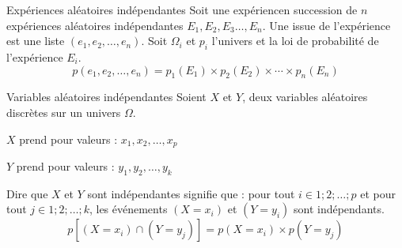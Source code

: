 \medskip

\begin{bclogo}{Expériences aléatoires indépendantes}
Soit une expériencen succession de $n$ expériences aléatoires indépendantes $E_1,E_2,E_3\ldots,E_n$. Une issue de l'expérience est une liste $(e_1,e_2,\ldots,e_n)$. Soit $\Omega_i$ et $p_i$ l'univers et la loi de probabilité de l'expérience $E_i$.
\[p(e_1,e_2,\ldots,e_n)=p_1(E_1)\times p_2(E_2)\times \cdots \times p_n(E_n)\]
\end{bclogo}

\medskip

\begin{bclogo}{Variables aléatoires indépendantes}
Soient $X$ et $Y$, deux variables aléatoires discrètes sur un univers $\Omega$. 

$X$ prend pour valeurs : $x_1,x_2,\ldots,x_p$

$Y$ prend pour valeurs : $y_1,y_2,\ldots,y_k$

Dire que $X$ et $Y$ sont indépendantes signifie que : pour tout $i\in {1;2;\ldots;p}$ et pour tout $j\in {1;2;\ldots;k}$, les événements $(X=x_i)$ et $(Y=y_i)$ sont indépendants. \[p\left[ (X=x_i)\cap (Y=y_j)\right] =p(X=x_i)\times p(Y=y_j)\]
\end{bclogo}